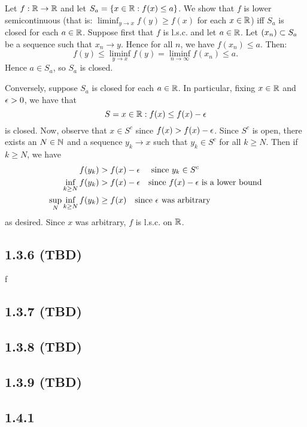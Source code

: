 \documentclass[11pt]{article}
\begin{document}
Let $f:{\mathbb R} \to {\mathbb R}$ and let $S_a = \{x \in {\mathbb R} : f(x) \leq a\}$. We show that $f$ is lower semicontinuous (that is: $\liminf_{y\to x}f(y) \geq f(x)$ for each $x \in {\mathbb R}$) iff $S_a$ is closed for each $a \in {\mathbb R}$. Suppose first that $f$ is l.s.c. and let $a \in {\mathbb R}$. Let $(x_n) \subset S_a$ be a sequence such that $x_n \to y$. Hence for all $n$, we have $f(x_n) \leq a$. Then: \[f(y) \leq \liminf_{y \to x} f(y) = \liminf_{n \to \infty} f(x_n) \leq a.\] Hence $a \in S_a$, so $S_a$ is closed. 

Conversely, suppose $S_a$ is closed for each $a \in {\mathbb R}$. In particular, fixing $x \in {\mathbb R}$ and $\epsilon > 0$, we have that \[S = x \in {\mathbb R} : f(x) \leq f(x) - \epsilon\] is closed. Now, observe that $x \in S^c$ since $f(x) > f(x) - \epsilon$. Since $S^c$ is open, there exists an $N \in {\mathbb N}$ and a sequence $y_k \to x$ such that $y_k \in S^c$ for all $k \geq N$. Then if $k \geq N$, we have \begin{align*}
    f(y_k) &> f(x) - \epsilon \quad \text{ since $y_k \in S^c$} \\
    \inf_{k \geq N} f(y_k) &> f(x) - \epsilon \quad \text{since $f(x)-\epsilon$ is a lower bound} \\
    \sup_{N} \inf_{k \geq N} f(y_k) &\geq f(x) \quad \text{since $\epsilon$ was arbitrary}
\end{align*} as desired. Since $x$ was arbitrary, $f$ is l.s.c. on ${\mathbb R}$.

\subsection*{1.3.6 (TBD)}


f

\subsection*{1.3.7 (TBD)}

\subsection*{1.3.8 (TBD)} 

\subsection*{1.3.9 (TBD)}

\subsection*{1.4.1}
\end{document}
